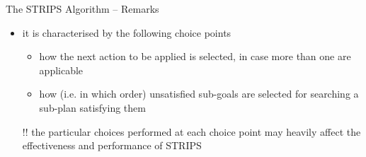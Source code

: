 \documentclass[presentation]{beamer}\mode<presentation>{\usetheme{AMSBolognaFC}}
\begin{document}
\begin{frame}[c,allowframebreaks]{The STRIPS Algorithm -- Remarks}
\begin{itemize}
\begin{description}
        \item[$reverse(L)$] it reverses the list $L$ provided as input
    \end{description}
    \item it is characterised by the following \alert{choice points}
    \begin{itemize}
        \item how the next action to be applied is selected, in case more than one are applicable
        \item how (i.e. in which order) unsatisfied sub-goals are selected for searching a sub-plan satisfying them
    \end{itemize}
    \item[!!] the particular choices performed at \alert{each} choice point may heavily affect the effectiveness and performance of STRIPS
\end{itemize}
\end{frame}
\end{document}
